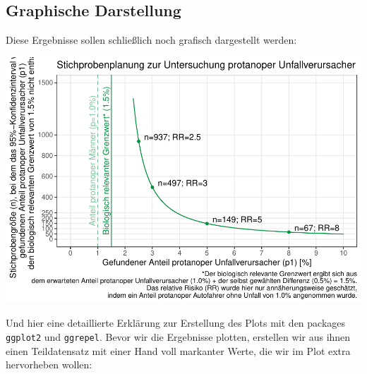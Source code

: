 \documentclass[
]{article}
\newenvironment{Shaded}{\begin{snugshade}}{\end{snugshade}}
\newcommand{\CommentTok}[1]{\textcolor[rgb]{0.56,0.35,0.01}{\textit{#1}}}
\newcommand{\DataTypeTok}[1]{\textcolor[rgb]{0.13,0.29,0.53}{#1}}
\newcommand{\DecValTok}[1]{\textcolor[rgb]{0.00,0.00,0.81}{#1}}
\newcommand{\FloatTok}[1]{\textcolor[rgb]{0.00,0.00,0.81}{#1}}
\newcommand{\KeywordTok}[1]{\textcolor[rgb]{0.13,0.29,0.53}{\textbf{#1}}}
\newcommand{\NormalTok}[1]{#1}
\newcommand{\OperatorTok}[1]{\textcolor[rgb]{0.81,0.36,0.00}{\textbf{#1}}}
\newcommand{\StringTok}[1]{\textcolor[rgb]{0.31,0.60,0.02}{#1}}
\begin{document}
\hypertarget{graphische-darstellung}{%
\subsection{Graphische Darstellung}\label{graphische-darstellung}}

Diese Ergebnisse sollen schließlich noch grafisch dargestellt werden:

\includegraphics{stat_samplesize_files/figure-latex/unnamed-chunk-17-1.pdf}

Und hier eine detaillierte Erklärung zur Erstellung des Plots mit den
packages \texttt{ggplot2} und \texttt{ggrepel}. Bevor wir die Ergebnisse
plotten, erstellen wir aus ihnen einen Teildatensatz mit einer Hand voll
markanter Werte, die wir im Plot extra hervorheben wollen:

\begin{Shaded}
\end{Shaded}
\end{document}
